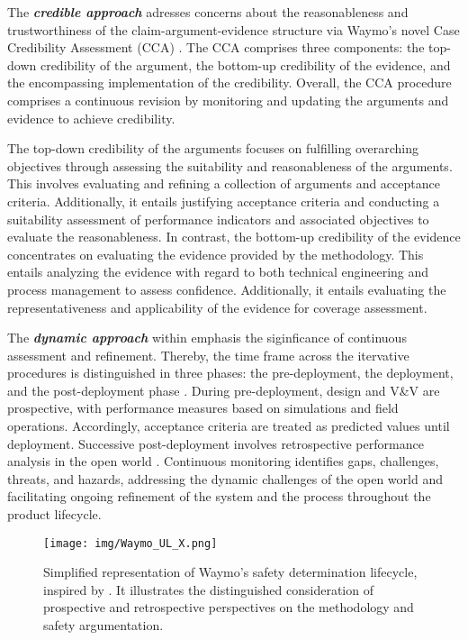 The \textit{\textbf{credible approach}} adresses concerns about the reasonableness and trustworthiness of the claim-argument-evidence structure via Waymo's novel Case Credibility Assessment (CCA) \cite{favaro2023building}. The CCA comprises three components: the top-down credibility of the argument, the bottom-up credibility of the evidence, and the encompassing implementation of the credibility. Overall, the CCA procedure comprises a continuous revision by monitoring and updating the arguments and evidence to achieve credibility.

The top-down credibility of the arguments focuses on fulfilling overarching objectives through assessing the suitability and reasonableness of the arguments. This involves evaluating and refining a collection of arguments and acceptance criteria. Additionally, it entails justifying acceptance criteria and conducting a suitability assessment of performance indicators and associated objectives to evaluate the reasonableness. In contrast, the bottom-up credibility of the evidence concentrates on evaluating the evidence provided by the methodology. This entails analyzing the evidence with regard to both technical engineering and process management to assess confidence. Additionally, it entails evaluating the representativeness and applicability of the evidence for coverage assessment.

The \textit{\textbf{dynamic approach}} within \cite{favaro2023building} emphasis the siginficance of continuous assessment and refinement. Thereby, the time frame across the itervative procedures is distinguished in three phases: the pre-deployment, the deployment, and the post-deployment phase \cite{favaro2023interpreting}. During pre-deployment, design and V\&V are prospective, with performance measures based on simulations and field operations. Accordingly, acceptance criteria are treated as predicted values until deployment. Successive post-deployment involves retrospective performance analysis in the open world \cite{scanlon2023benchmarks}. Continuous monitoring identifies gaps, challenges, threats, and hazards, addressing the dynamic challenges of the open world and facilitating ongoing refinement of the system and the process throughout the product lifecycle.

\begin{figure}[]
	\centering	
	\texttt{[image: img/Waymo\_UL\_X.png]}
	\caption{Simplified representation of Waymo's safety determination lifecycle, inspired by \cite{favaro2023building}. It illustrates the distinguished consideration of prospective and retrospective perspectives on the methodology and safety argumentation.}
	\label{fig:Waymo}
\end{figure}


